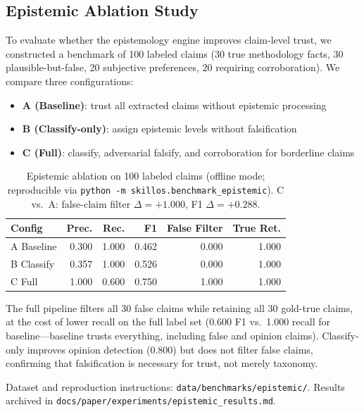 \documentclass[11pt]{article}
\begin{document}
\subsection{Epistemic Ablation Study}
\label{sec:epistemic-ablation}

To evaluate whether the epistemology engine improves claim-level trust, we constructed a benchmark of 100 labeled claims (30 true methodology facts, 30 plausible-but-false, 20 subjective preferences, 20 requiring corroboration). We compare three configurations:

\begin{itemize}[leftmargin=*,nosep]
    \item \textbf{A (Baseline)}: trust all extracted claims without epistemic processing
    \item \textbf{B (Classify-only)}: assign epistemic levels without falsification
    \item \textbf{C (Full)}: classify, adversarial falsify, and corroboration for borderline claims
\end{itemize}

\begin{table}[h]
\centering
\begin{tabular}{lrrrrr}
\toprule
\textbf{Config} & \textbf{Prec.} & \textbf{Rec.} & \textbf{F1} & \textbf{False Filter} & \textbf{True Ret.} \\
\midrule
A Baseline   & 0.300 & 1.000 & 0.462 & 0.000 & 1.000 \\
B Classify   & 0.357 & 1.000 & 0.526 & 0.000 & 1.000 \\
C Full       & 1.000 & 0.600 & 0.750 & 1.000 & 1.000 \\
\bottomrule
\end{tabular}
\caption{Epistemic ablation on 100 labeled claims (offline mode; reproducible via \texttt{python -m skillos.benchmark\_epistemic}). C vs.\ A: false-claim filter $\Delta{=}+1.000$, F1 $\Delta{=}+0.288$.}
\label{tab:epistemic-ablation}
\end{table}

The full pipeline filters all 30 false claims while retaining all 30 gold-true claims, at the cost of lower recall on the full label set (0.600 F1 vs.\ 1.000 recall for baseline---baseline trusts everything, including false and opinion claims). Classify-only improves opinion detection (0.800) but does not filter false claims, confirming that falsification is necessary for trust, not merely taxonomy.

Dataset and reproduction instructions: \texttt{data/benchmarks/epistemic/}. Results archived in \texttt{docs/paper/experiments/epistemic\_results.md}.
\end{document}
